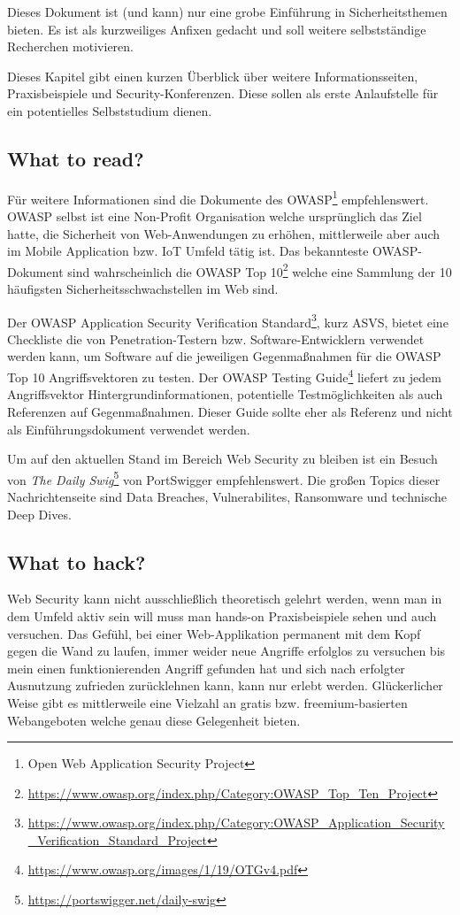 Dieses Dokument ist (und kann) nur eine grobe Einführung in Sicherheitsthemen bieten. Es ist als kurzweiliges Anfixen gedacht und soll weitere selbstständige Recherchen motivieren.

Dieses Kapitel gibt einen kurzen Überblick über weitere Informationsseiten, Praxisbeispiele und Security-Konferenzen. Diese sollen als erste Anlaufstelle für ein potentielles Selbststudium dienen.

\subsection{What to read?}

Für weitere Informationen sind die Dokumente des OWASP\footnote{Open Web Application Security Project} empfehlenswert. OWASP selbst ist eine Non-Profit Organisation welche ursprünglich das Ziel hatte, die Sicherheit von Web-Anwendungen zu erhöhen, mittlerweile aber auch im Mobile Application bzw. IoT Umfeld tätig ist. Das bekannteste OWASP-Dokument sind wahrscheinlich die OWASP Top 10\footnote{\url{https://www.owasp.org/index.php/Category:OWASP_Top_Ten_Project}} welche eine Sammlung der 10 häufigsten Sicherheitsschwachstellen im Web sind.

Der OWASP Application Security Verification Standard\footnote{\url{https://www.owasp.org/index.php/Category:OWASP_Application_Security_Verification_Standard_Project}}, kurz ASVS, bietet eine Checkliste die von Penetration-Testern bzw. Software-Entwicklern verwendet werden kann, um Software auf die jeweiligen Gegenmaßnahmen für die OWASP Top 10 Angriffsvektoren zu testen. Der OWASP Testing Guide\footnote{\url{https://www.owasp.org/images/1/19/OTGv4.pdf}} liefert zu jedem Angriffsvektor Hintergrundinformationen, potentielle Testmöglichkeiten als auch Referenzen auf Gegenmaßnahmen. Dieser Guide sollte eher als Referenz und nicht als Einführungsdokument verwendet werden.

Um auf den aktuellen Stand im Bereich Web Security zu bleiben ist ein Besuch von \textit{The Daily Swig}\footnote{\url{https://portswigger.net/daily-swig}} von PortSwigger empfehlenswert. Die großen Topics dieser Nachrichtenseite sind Data Breaches, Vulnerabilites, Ransomware und technische Deep Dives.

\subsection{What to hack?}

Web Security kann nicht ausschließlich theoretisch gelehrt werden, wenn man in dem Umfeld aktiv sein will muss man hands-on Praxisbeispiele sehen und auch versuchen. Das Gefühl, bei einer Web-Applikation permanent mit dem Kopf gegen die Wand zu laufen, immer weider neue Angriffe erfolglos zu versuchen bis mein einen funktionierenden Angriff gefunden hat und sich nach erfolgter Ausnutzung zufrieden zurücklehnen kann, kann nur erlebt werden. Glückerlicher Weise gibt es mittlerweile eine Vielzahl an gratis bzw. freemium-basierten Webangeboten welche genau diese Gelegenheit bieten.

